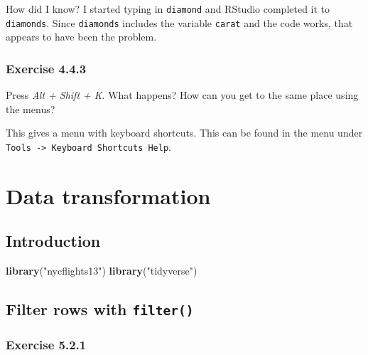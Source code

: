 \documentclass[]{book}
\newenvironment{Shaded}{\begin{snugshade}}{\end{snugshade}}
\newcommand{\KeywordTok}[1]{\textcolor[rgb]{0.13,0.29,0.53}{\textbf{#1}}}
\newcommand{\NormalTok}[1]{#1}
\newcommand{\StringTok}[1]{\textcolor[rgb]{0.31,0.60,0.02}{#1}}
\theoremstyle{plain}
\theoremstyle{remark}
\theoremstyle{definition}
\theoremstyle{definition}
\theoremstyle{definition}
\theoremstyle{remark}
\begin{document}
How did I know? I started typing in \texttt{diamond} and RStudio
completed it to \texttt{diamonds}. Since \texttt{diamonds} includes the
variable \texttt{carat} and the code works, that appears to have been
the problem.

\hypertarget{exercise-4.4.3}{%
\subsection*{\texorpdfstring{Exercise
{4.4.3}}{Exercise 4.4.3}}\label{exercise-4.4.3}}

Press \emph{Alt + Shift + K}. What happens? How can you get to the same
place using the menus?

This gives a menu with keyboard shortcuts. This can be found in the menu
under \texttt{Tools\ -\textgreater{}\ Keyboard\ Shortcuts\ Help}.

\hypertarget{data-transformation}{%
\chapter{Data transformation}\label{data-transformation}}

\hypertarget{introduction-2}{%
\section{Introduction}\label{introduction-2}}

\begin{Shaded}
\begin{Highlighting}[]
\KeywordTok{library}\NormalTok{(}\StringTok{"nycflights13"}\NormalTok{)}
\KeywordTok{library}\NormalTok{(}\StringTok{"tidyverse"}\NormalTok{)}
\end{Highlighting}
\end{Shaded}

\hypertarget{filter-rows-with-filter}{%
\section{\texorpdfstring{Filter rows with
\texttt{filter()}}{Filter rows with filter()}}\label{filter-rows-with-filter}}

\hypertarget{exercise-5.2.1}{%
\subsection*{\texorpdfstring{Exercise
{5.2.1}}{Exercise 5.2.1}}\label{exercise-5.2.1}}
\end{document}
